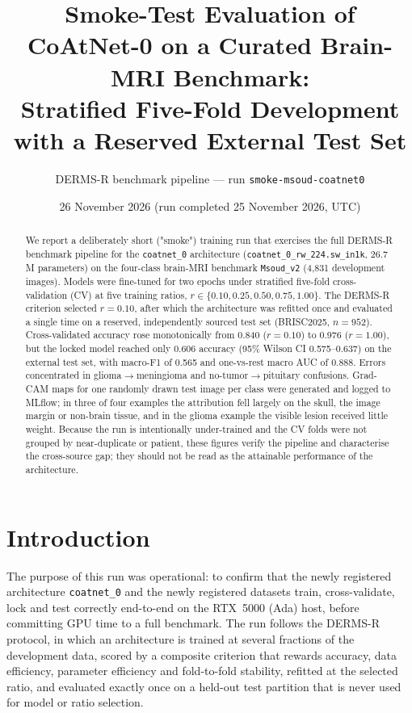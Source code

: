 \documentclass[10pt,a4paper]{article}
\title{\vspace{-1.2cm}\textbf{Smoke-Test Evaluation of CoAtNet-0 on a Curated Brain-MRI Benchmark:\\ Stratified Five-Fold Development with a Reserved External Test Set}}
\author{DERMS-R benchmark pipeline --- run \texttt{smoke-msoud-coatnet0}}
\date{26 November 2026 (run completed 25 November 2026, UTC)}
\begin{document}
\maketitle
\begin{abstract}
\noindent We report a deliberately short ("smoke") training run that exercises the full DERMS-R benchmark pipeline for the \texttt{coatnet\_0} architecture (\texttt{coatnet\_0\_rw\_224.sw\_in1k}, 26.7\,M parameters) on the four-class brain-MRI benchmark \texttt{Msoud\_v2} (4,831 development images). Models were fine-tuned for two epochs under stratified five-fold cross-validation (CV) at five training ratios, $r\in\{0.10,0.25,0.50,0.75,1.00\}$. The DERMS-R criterion selected $r=0.10$, after which the architecture was refitted once and evaluated a single time on a reserved, independently sourced test set (BRISC2025, $n=952$). Cross-validated accuracy rose monotonically from 0.840 ($r=0.10$) to 0.976 ($r=1.00$), but the locked model reached only 0.606 accuracy (95\% Wilson CI 0.575--0.637) on the external test set, with macro-F1 of 0.565 and one-vs-rest macro AUC of 0.888. Errors concentrated in glioma$\rightarrow$meningioma and no-tumor$\rightarrow$pituitary confusions. Grad-CAM maps for one randomly drawn test image per class were generated and logged to MLflow; in three of four examples the attribution fell largely on the skull, the image margin or non-brain tissue, and in the glioma example the visible lesion received little weight. Because the run is intentionally under-trained and the CV folds were not grouped by near-duplicate or patient, these figures verify the pipeline and characterise the cross-source gap; they should not be read as the attainable performance of the architecture.
\end{abstract}

\section{Introduction}
The purpose of this run was operational: to confirm that the newly registered architecture \texttt{coatnet\_0} and the newly registered datasets train, cross-validate, lock and test correctly end-to-end on the RTX~5000 (Ada) host, before committing GPU time to a full benchmark. The run follows the DERMS-R protocol, in which an architecture is trained at several fractions of the development data, scored by a composite criterion that rewards accuracy, data efficiency, parameter efficiency and fold-to-fold stability, refitted at the selected ratio, and evaluated exactly once on a held-out test partition that is never used for model or ratio selection.
\end{document}
